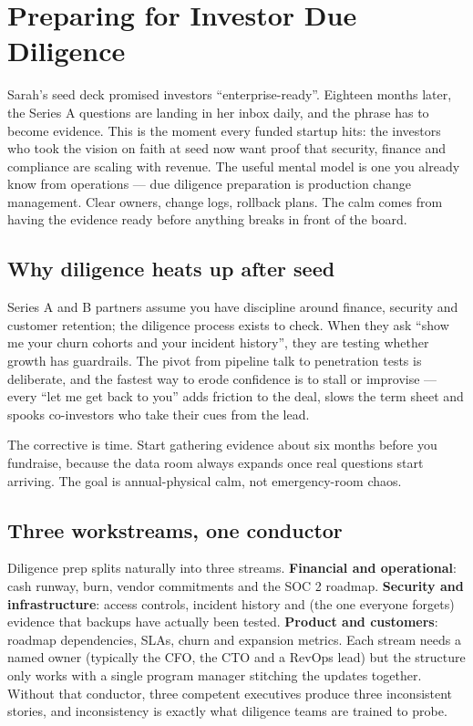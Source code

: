 \section{Preparing for Investor Due Diligence}
Sarah's seed deck promised investors ``enterprise-ready''. Eighteen months later, the Series A questions are landing in her inbox daily, and the phrase has to become evidence. This is the moment every funded startup hits: the investors who took the vision on faith at seed now want proof that security, finance and compliance are scaling with revenue. The useful mental model is one you already know from operations — due diligence preparation is production change management. Clear owners, change logs, rollback plans. The calm comes from having the evidence ready before anything breaks in front of the board.



\subsection{Why diligence heats up after seed}


Series A and B partners assume you have discipline around finance, security and customer retention; the diligence process exists to check. When they ask ``show me your churn cohorts and your incident history'', they are testing whether growth has guardrails. The pivot from pipeline talk to penetration tests is deliberate, and the fastest way to erode confidence is to stall or improvise — every ``let me get back to you'' adds friction to the deal, slows the term sheet and spooks co-investors who take their cues from the lead.


The corrective is time. Start gathering evidence about six months before you fundraise, because the data room always expands once real questions start arriving. The goal is annual-physical calm, not emergency-room chaos.



\subsection{Three workstreams, one conductor}


Diligence prep splits naturally into three streams. \textbf{Financial and operational}: cash runway, burn, vendor commitments and the SOC 2 roadmap. \textbf{Security and infrastructure}: access controls, incident history and (the one everyone forgets) evidence that backups have actually been tested. \textbf{Product and customers}: roadmap dependencies, SLAs, churn and expansion metrics. Each stream needs a named owner (typically the CFO, the CTO and a RevOps lead) but the structure only works with a single program manager stitching the updates together. Without that conductor, three competent executives produce three inconsistent stories, and inconsistency is exactly what diligence teams are trained to probe.



